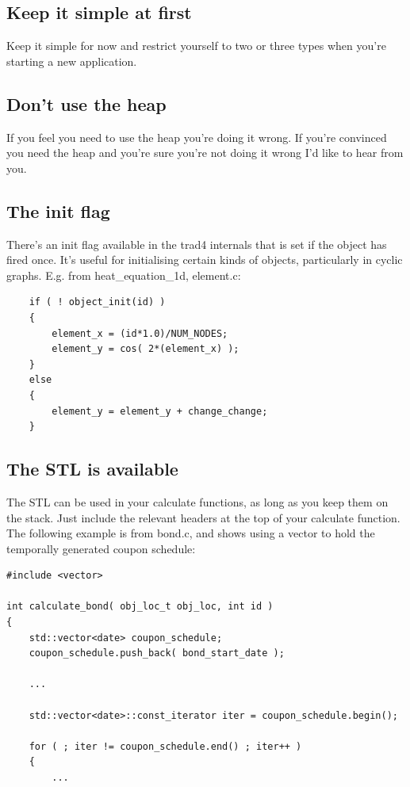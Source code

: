 \documentclass{report}
\begin{document}
\subsection{Keep it simple at first}

Keep it simple for now and restrict yourself to two or three types when you're starting a new application.

\subsection{Don't use the heap}

If you feel you need to use the heap you're doing it wrong. If you're convinced you need the heap and you're sure you're not doing it wrong I'd like to hear from you.

\subsection{The init flag}

There's an init flag available in the trad4 internals that is set if the object has fired once. It's useful for initialising certain kinds of objects, particularly in cyclic graphs. E.g. from heat_equation_1d, element.c:

\begin{verbatim}
    if ( ! object_init(id) )
    {
        element_x = (id*1.0)/NUM_NODES;
        element_y = cos( 2*(element_x) );
    }
    else
    {
        element_y = element_y + change_change;
    }
\end{verbatim}

\subsection{The STL is available}

The STL  can be used in your calculate functions, as long as you keep them on the stack. Just include the relevant headers at the top of your calculate function. The following example is from bond.c, and shows using a vector to hold the temporally generated coupon schedule:

\begin{verbatim}
#include <vector>

int calculate_bond( obj_loc_t obj_loc, int id )
{
    std::vector<date> coupon_schedule;
    coupon_schedule.push_back( bond_start_date );

    ...

    std::vector<date>::const_iterator iter = coupon_schedule.begin();

    for ( ; iter != coupon_schedule.end() ; iter++ )
    {
        ...
\end{verbatim}
\end{document}
